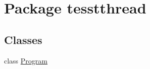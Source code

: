 \hypertarget{namespacetesstthread}{}\section{Package tesstthread}
\label{namespacetesstthread}
\subsection*{Classes}
\begin{DoxyCompactItemize}
\item 
class \hyperlink{classtesstthread_1_1_program}{Program}
\end{DoxyCompactItemize}
